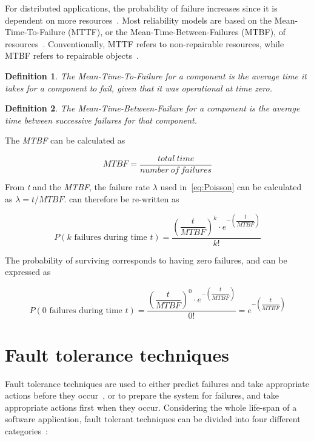 \documentclass{cslthse-msc}
\newtheorem{definition}{Definition}[chapter]
\begin{document}
For distributed applications, the probability of failure increases since it is dependent on more resources~\cite{relModelDistSimSystem}. Most reliability models are based on the Mean-Time-To-Failure (MTTF), or the Mean-Time-Between-Failures (MTBF), of resources~\cite{relModelAnalysis}. Conventionally, MTTF refers to non-repairable resources, while MTBF refers to repairable objects~\cite{effTaskReplMobGrid}.

\begin{definition} \label{def:mttf}
The Mean-Time-To-Failure for a component is the average time it takes for a component to fail, given that it was operational at time zero.
\end{definition}

\begin{definition} \label{def:MTBF}
The Mean-Time-Between-Failure for a component is the average time between successive failures for that component.
\end{definition}

The \emph{MTBF} can be calculated as

\begin{equation} \label{eq:MTBF}
MTBF = \frac{total\ time}{number\ of\ failures}
\end{equation}

From \emph{t} and the \emph{MTBF}, the failure rate $\lambda$ used in~\cref{eq:Poisson} can be calculated as $\lambda = t/MTBF$.  can therefore be re-written as

\begin{equation} \label{eq:Poisson_during_time_t}
P(k \mbox{ failures during time } t) = \dfrac{\left(\dfrac{t}{MTBF}\right)^k \cdot e^{-\left(\dfrac{t}{MTBF}\right)}}{k!}
\end{equation}

The probability of surviving corresponds to having zero failures, and can be expressed as

\begin{equation} \label{eq:Poisson_no_failures}
P(0 \mbox{ failures during time } t) = \dfrac{\left(\dfrac{t}{MTBF}\right)^0 \cdot e^{-\left(\dfrac{t}{MTBF}\right)}}{0!} = e^{-\left(\dfrac{t}{MTBF}\right)}
\end{equation}

\section{Fault tolerance techniques} \label{sec:background_fault_tol_tech}
Fault tolerance techniques are used to either predict failures and take appropriate actions before they occur~\cite{faultToleranceChallenges}, or to prepare the system for failures, and take appropriate actions first when they occur. Considering the whole life-span of a software application, fault tolerant techniques can be divided into four different categories~\cite{surveyReliabilityDistr}:
\end{document}
